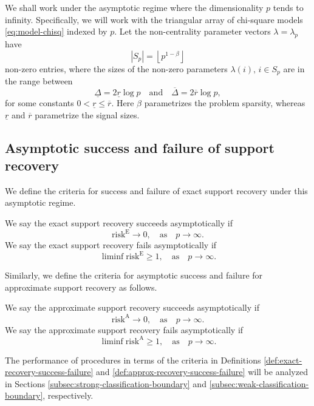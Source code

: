 
We shall work under the asymptotic regime where the dimensionality $p$ tends to infinity.
Specifically, we will work with the triangular array of chi-square models \eqref{eq:model-chisq} indexed by $p$.
Let the non-centrality parameter vectors $\lambda = \lambda_p$ have 
\begin{equation} \label{eq:signal-sparsity}
    |S_p| = \left\lfloor p^{1-\beta} \right\rfloor
\end{equation}
non-zero entries, where the sizes of the non-zero parameters $\lambda(i),\,i\in S_p$ are in the range between
\begin{equation} \label{eq:signal-size}
    \underline{\Delta} = 2\underline{r}\log{p}
    \quad\text{and}\quad
    \overline{\Delta} = 2\overline{r}\log{p},
\end{equation}
for some constants $0<\underline{r}\le\overline{r}$.
Here $\beta$ parametrizes the problem sparsity, whereas $\underline{r}$ and $\overline{r}$ parametrize the signal sizes.

\subsection{Asymptotic success and failure of support recovery}

We define the criteria for success and failure of exact support recovery under this asymptotic regime.
\begin{definition} \label{def:exact-recovery-success-failure}
We say the exact support recovery succeeds asymptotically if 
\begin{equation} \label{eq:exact-recovery-success}
    \mathrm{risk}^{\mathrm{E}}\to0, \quad \text{as}\quad p\to\infty.
\end{equation}
We say the exact support recovery fails asymptotically if 
\begin{equation} \label{eq:exact-recovery-failure}
    \liminf\mathrm{risk}^{\mathrm{E}}\ge1, \quad \text{as}\quad p\to\infty.
\end{equation}
\end{definition}
Similarly, we define the criteria for asymptotic success and failure for approximate support recovery as follows.
\begin{definition} \label{def:approx-recovery-success-failure}
We say the approximate support recovery succeeds asymptotically if 
\begin{equation} \label{eq:approx-recovery-success}
    \mathrm{risk}^{\mathrm{A}}\to0, \quad \text{as}\quad p\to\infty.
\end{equation}
We say the approximate support recovery fails asymptotically if 
\begin{equation} \label{eq:approx-recovery-failure}
    \liminf\mathrm{risk}^{\mathrm{A}}\ge1, \quad \text{as}\quad p\to\infty.
\end{equation}
\end{definition}
The performance of procedures in terms of the criteria in Definitions \ref{def:exact-recovery-success-failure} and \ref{def:approx-recovery-success-failure} will be analyzed in Sections \ref{subsec:strong-classification-boundary} and \ref{subsec:weak-classification-boundary}, respectively.

